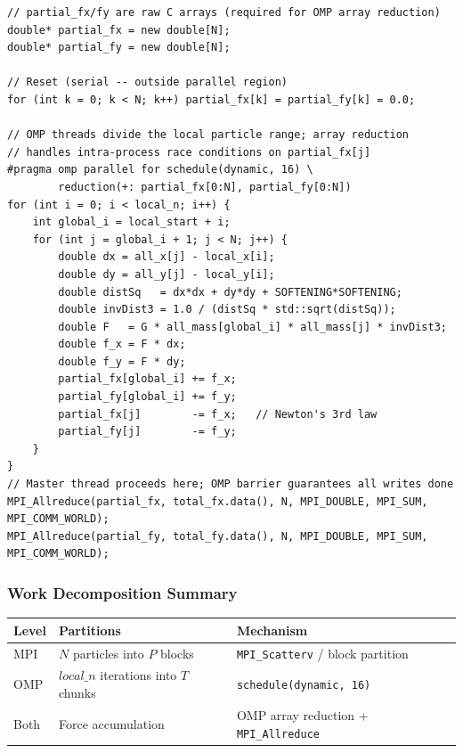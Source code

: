﻿\documentclass[12pt,a4paper]{article}
\begin{document}
\begin{lstlisting}
// partial_fx/fy are raw C arrays (required for OMP array reduction)
double* partial_fx = new double[N];
double* partial_fy = new double[N];

// Reset (serial -- outside parallel region)
for (int k = 0; k < N; k++) partial_fx[k] = partial_fy[k] = 0.0;

// OMP threads divide the local particle range; array reduction
// handles intra-process race conditions on partial_fx[j]
#pragma omp parallel for schedule(dynamic, 16) \
        reduction(+: partial_fx[0:N], partial_fy[0:N])
for (int i = 0; i < local_n; i++) {
    int global_i = local_start + i;
    for (int j = global_i + 1; j < N; j++) {
        double dx = all_x[j] - local_x[i];
        double dy = all_y[j] - local_y[i];
        double distSq   = dx*dx + dy*dy + SOFTENING*SOFTENING;
        double invDist3 = 1.0 / (distSq * std::sqrt(distSq));
        double F   = G * all_mass[global_i] * all_mass[j] * invDist3;
        double f_x = F * dx;
        double f_y = F * dy;
        partial_fx[global_i] += f_x;
        partial_fy[global_i] += f_y;
        partial_fx[j]        -= f_x;   // Newton's 3rd law
        partial_fy[j]        -= f_y;
    }
}
// Master thread proceeds here; OMP barrier guarantees all writes done
MPI_Allreduce(partial_fx, total_fx.data(), N, MPI_DOUBLE, MPI_SUM, MPI_COMM_WORLD);
MPI_Allreduce(partial_fy, total_fy.data(), N, MPI_DOUBLE, MPI_SUM, MPI_COMM_WORLD);
\end{lstlisting}

\subsubsection*{Work Decomposition Summary}

\begin{center}
\begin{tabular}{lll}
    \toprule
    \textbf{Level} & \textbf{Partitions} & \textbf{Mechanism} \\
    \midrule
    MPI  & $N$ particles into $P$ blocks  & \texttt{MPI\_Scatterv} / block partition \\
    OMP  & $\textit{local\_n}$ iterations into $T$ chunks & \texttt{schedule(dynamic, 16)} \\
    Both & Force accumulation             & OMP array reduction + \texttt{MPI\_Allreduce} \\
    \bottomrule
\end{tabular}
\end{center}
\end{document}
